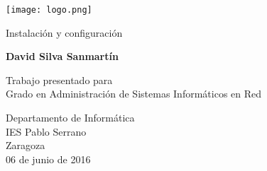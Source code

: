 \begin{titlepage}
    \begin{center}
        \vspace*{1cm}

        \texttt{[image: logo.png]}

        \LARGE
        Instalación y configuración
        
        \vspace{1.5cm}
        
        \textbf{David Silva Sanmartín}
        
        \vfill
        
        Trabajo presentado para\\
        Grado en Administración de Sistemas Informáticos en Red
        
        \vspace{0.8cm}
        
        \Large
        Departamento de Informática\\
        IES Pablo Serrano\\
        Zaragoza\\
        06 de junio de 2016
        
    \end{center}
\end{titlepage}
